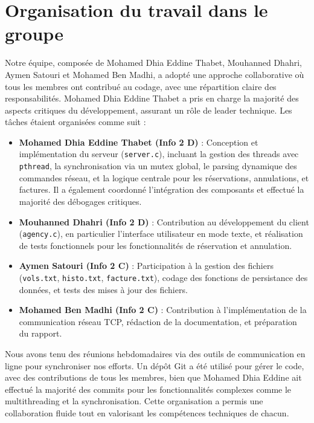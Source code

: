 \documentclass[a4paper,12pt]{article}
\begin{document}
\section{Organisation du travail dans le groupe}
Notre équipe, composée de Mohamed Dhia Eddine Thabet, Mouhanned Dhahri, Aymen Satouri et Mohamed Ben Madhi, a adopté une approche collaborative où tous les membres ont contribué au codage, avec une répartition claire des responsabilités. Mohamed Dhia Eddine Thabet a pris en charge la majorité des aspects critiques du développement, assurant un rôle de leader technique. Les tâches étaient organisées comme suit :
\begin{itemize}
    \item \textbf{Mohamed Dhia Eddine Thabet (Info 2 D)} : Conception et implémentation du serveur (\texttt{server.c}), incluant la gestion des threads avec \texttt{pthread}, la synchronisation via un mutex global, le parsing dynamique des commandes réseau, et la logique centrale pour les réservations, annulations, et factures. Il a également coordonné l'intégration des composants et effectué la majorité des débogages critiques.
    \item \textbf{Mouhanned Dhahri (Info 2 D)} : Contribution au développement du client (\texttt{agency.c}), en particulier l'interface utilisateur en mode texte, et réalisation de tests fonctionnels pour les fonctionnalités de réservation et annulation.
    \item \textbf{Aymen Satouri (Info 2 C)} : Participation à la gestion des fichiers (\texttt{vols.txt}, \texttt{histo.txt}, \texttt{facture.txt}), codage des fonctions de persistance des données, et tests des mises à jour des fichiers.
    \item \textbf{Mohamed Ben Madhi (Info 2 C)} : Contribution à l'implémentation de la communication réseau TCP, rédaction de la documentation, et préparation du rapport.
\end{itemize}
Nous avons tenu des réunions hebdomadaires via des outils de communication en ligne pour synchroniser nos efforts. Un dépôt Git a été utilisé pour gérer le code, avec des contributions de tous les membres, bien que Mohamed Dhia Eddine ait effectué la majorité des commits pour les fonctionnalités complexes comme le multithreading et la synchronisation. Cette organisation a permis une collaboration fluide tout en valorisant les compétences techniques de chacun.
\end{document}

